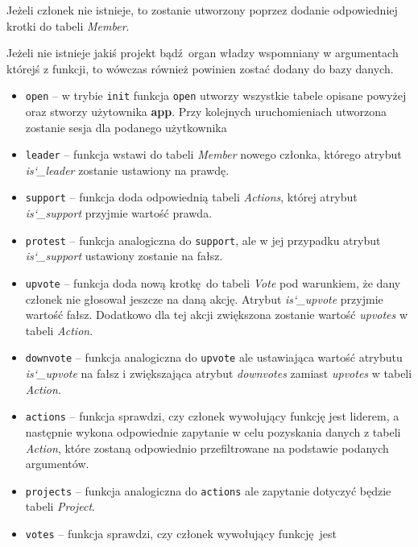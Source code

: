 \documentclass[12pt]{article}
\begin{document}
Jeżeli członek nie istnieje, to zostanie utworzony poprzez dodanie odpowiedniej
krotki do tabeli \textit{Member}.

Jeżeli nie istnieje jakiś projekt bądź organ władzy wspomniany w argumentach którejś
z funkcji, to wówczas również powinien zostać dodany do bazy danych.

\begin{itemize}
    \item{\texttt{open} -- w trybie \texttt{init} funkcja \texttt{open} utworzy
          wszystkie tabele opisane powyżej oraz stworzy użytownika \textbf{app}.
          Przy kolejnych uruchomieniach utworzona zostanie sesja dla podanego
          użytkownika}
    \item{\texttt{leader} -- funkcja wstawi do tabeli \textit{Member} nowego
          członka, którego atrybut \textit{is\char`_leader} zostanie ustawiony
          na prawdę.}
    \item{\texttt{support} -- funkcja doda odpowiednią tabeli \textit{Actions},
          której atrybut \textit{is\char`_support} przyjmie wartość prawda.}
    \item{\texttt{protest} -- funkcja analogiczna do \texttt{support}, ale w jej
          przypadku atrybut \textit{is\char`_support} ustawiony zostanie na fałsz.}
    \item{\texttt{upvote} -- funkcja doda nową krotkę do tabeli \textit{Vote} pod warunkiem,
          że dany członek nie głosował jeszcze na daną akcję. Atrybut \textit{is\char`_upvote}
          przyjmie wartość fałsz. Dodatkowo dla tej akcji zwiększona zostanie
          wartość \textit{upvotes} w tabeli \textit{Action}}.
    \item{\texttt{downvote} -- funkcja analogiczna do \texttt{upvote} ale ustawiająca
          wartość atrybutu \textit{is\char`_upvote} na fałsz i zwiększająca atrybut
          \textit{downvotes} zamiast \textit{upvotes} w tabeli \textit{Action}}.
    \item{\texttt{actions} -- funkcja sprawdzi, czy członek wywołujący funkcję
          jest liderem, a następnie wykona odpowiednie zapytanie w celu pozyskania
          danych z tabeli \textit{Action}, które zostaną odpowiednio przefiltrowane
          na podstawie podanych argumentów.}
    \item{\texttt{projects} -- funkcja analogiczna do \texttt{actions} ale
          zapytanie dotyczyć będzie tabeli \textit{Project}.}
    \item{\texttt{votes} -- funkcja sprawdzi, czy członek wywołujący funkcję jest
}
\end{itemize}
\end{document}
